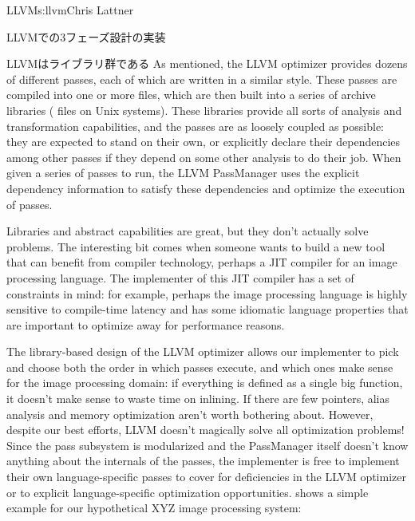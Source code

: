 \begin{aosachapter}{LLVM}{s:llvm}{Chris Lattner}
\begin{aosasect1}{LLVMでの3フェーズ設計の実装}
\begin{aosasect2}{LLVMはライブラリ群である}
As mentioned, the LLVM optimizer provides dozens of different passes,
each of which are written in a similar style.  These passes are
compiled into one or more  files, which are then built into a
series of archive libraries ( files on Unix systems). These
libraries provide all sorts of analysis and transformation
capabilities, and the passes are as loosely coupled as possible: they
are expected to stand on their own, or explicitly declare their
dependencies among other passes if they depend on some other analysis
to do their job.  When given a series of passes to run, the LLVM
PassManager uses the explicit dependency information to satisfy these
dependencies and optimize the execution of passes.

Libraries and abstract capabilities are great, but they don't actually
solve problems.  The interesting bit comes when someone wants to build
a new tool that can benefit from compiler technology, perhaps a JIT
compiler for an image processing language.  The implementer of this
JIT compiler has a set of constraints in mind: for example, perhaps
the image processing language is highly sensitive to compile-time
latency and has some idiomatic language properties that are important
to optimize away for performance reasons.

The library-based design of the LLVM optimizer allows our implementer
to pick and choose both the order in which passes execute, and which
ones make sense for the image processing domain: if everything is
defined as a single big function, it doesn't make sense to waste time
on inlining.  If there are few pointers, alias analysis and memory
optimization aren't worth bothering about.  However, despite our best
efforts, LLVM doesn't magically solve all optimization problems!
Since the pass subsystem is modularized and the PassManager itself
doesn't know anything about the internals of the passes, the
implementer is free to implement their own language-specific passes to
cover for deficiencies in the LLVM optimizer or to explicit
language-specific optimization opportunities.
 shows a simple example for our hypothetical
XYZ image processing system:



\end{aosasect2}
\end{aosasect1}
\end{aosachapter}
